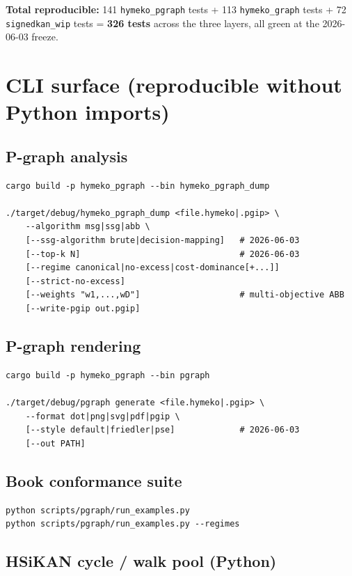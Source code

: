 \documentclass[11pt]{article}
\begin{document}
\textbf{Total reproducible:} 141 \texttt{hymeko\_pgraph} tests + 113
\texttt{hymeko\_graph} tests + 72 \texttt{signedkan\_wip} tests =
\textbf{326 tests} across the three layers, all green at the
2026-06-03 freeze.

\section{CLI surface (reproducible without Python imports)}

\subsection{P-graph analysis}

\begin{lstlisting}
cargo build -p hymeko_pgraph --bin hymeko_pgraph_dump

./target/debug/hymeko_pgraph_dump <file.hymeko|.pgip> \
    --algorithm msg|ssg|abb \
    [--ssg-algorithm brute|decision-mapping]   # 2026-06-03
    [--top-k N]                                # 2026-06-03
    [--regime canonical|no-excess|cost-dominance[+...]]
    [--strict-no-excess]
    [--weights "w1,...,wD"]                    # multi-objective ABB
    [--write-pgip out.pgip]
\end{lstlisting}

\subsection{P-graph rendering}

\begin{lstlisting}
cargo build -p hymeko_pgraph --bin pgraph

./target/debug/pgraph generate <file.hymeko|.pgip> \
    --format dot|png|svg|pdf|pgip \
    [--style default|friedler|pse]             # 2026-06-03
    [--out PATH]
\end{lstlisting}

\subsection{Book conformance suite}

\begin{lstlisting}
python scripts/pgraph/run_examples.py
python scripts/pgraph/run_examples.py --regimes
\end{lstlisting}

\subsection{HSiKAN cycle / walk pool (Python)}
\end{document}
